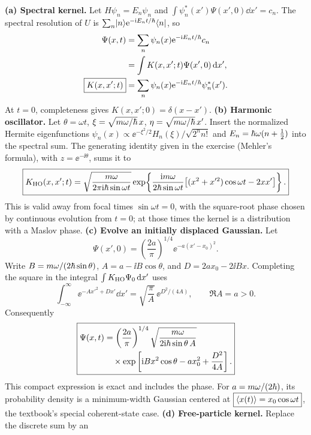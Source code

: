 \textbf{(a) Spectral kernel.}
Let $H\psi_n=E_n\psi_n$ and
$\int\psi_n^*(x')\Psi(x',0)\dd x'=c_n$.
The spectral resolution of $U$ is
$\sum_n\lvert n\rangle\mathrm e^{-\mathrm i E_nt/\hbar}\langle n\rvert$,
so
\begin{align}
\Psi(x,t)&=\sum_n\psi_n(x)
\mathrm e^{-\mathrm i E_nt/\hbar}c_n\\
&=\int K(x,x';t)\Psi(x',0)\,\mathrm d x',\\
\boxed{K(x,x';t)}&=
\sum_n\psi_n(x)\mathrm e^{-\mathrm i E_nt/\hbar}
\psi_n^*(x').
\end{align}
At $t=0$, completeness gives
$K(x,x';0)=\delta(x-x')$.
\textbf{(b) Harmonic oscillator.}
Let $\theta=\omega t$,
$\xi=\sqrt{m\omega/\hbar}\,x$,
$\eta=\sqrt{m\omega/\hbar}\,x'$.
Insert the normalized Hermite
eigenfunctions
$\psi_n(x)\propto
\ee^{-\xi^2/2}H_n(\xi)/\sqrt{2^nn!}$
and $E_n=\hbar\omega(n+\frac12)$
into the spectral sum.
The generating identity given in
the exercise (Mehler's formula),
with $z=\ee^{-\ii\theta}$,
sums it to
\begin{equation}
\boxed{
K_{\rm HO}(x,x';t)=
\sqrt{\frac{m\omega}{2\pi\mathrm i\hbar\sin\omega t}}
\exp\!\left\{
\frac{\mathrm i m\omega}{2\hbar\sin\omega t}
\big[(x^2+x'^2)\cos\omega t-2xx'\big]
\right\}.}
\end{equation}
This is valid away from focal
times $\sin\omega t=0$, with the
square-root phase chosen by
continuous evolution from $t=0$;
at those times the kernel is a
distribution with a Maslov phase.
\textbf{(c) Evolve an initially displaced Gaussian.}
Let
\[
\Psi(x',0)=\left(\frac{2a}{\pi}\right)^{1/4}
\ee^{-a(x'-x_0)^2}.
\]
Write
$B=m\omega/(2\hbar\sin\theta)$,
$A=a-\ii B\cos\theta$, and
$D=2ax_0-2\ii Bx$.
Completing the square in the
integral $\int K_{\rm HO}\Psi_0\,\mathrm d x'$
uses
\[
\int_{-\infty}^{\infty}
\ee^{-Ax'^2+Dx'}\dd x'
=\sqrt{\frac{\pi}{A}}\,
\ee^{D^2/(4A)},\qquad
\Re A=a>0.
\]
Consequently
\begin{equation}
\boxed{\begin{aligned}
\Psi(x,t)&=
\left(\frac{2a}{\pi}\right)^{1/4}
\sqrt{\frac{m\omega}{2\mathrm i\hbar\sin\theta\, A}}\\
&\quad\times\exp\left[
\mathrm i Bx^2\cos\theta-ax_0^2+
\frac{D^2}{4A}\right].
\end{aligned}}
\end{equation}
This compact expression is exact and
includes the phase.
For $a=m\omega/(2\hbar)$, its
probability density is a
minimum-width Gaussian centered at
$\boxed{\langle x(t)\rangle=x_0\cos\omega t}$,
the textbook's special coherent-state case.
\textbf{(d) Free-particle kernel.}
Replace the discrete sum by an
